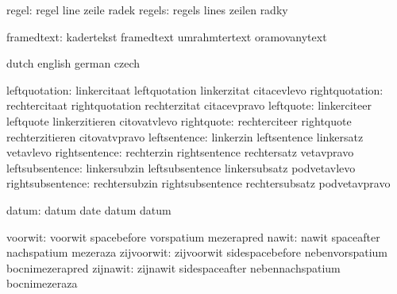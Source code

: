               regel:  regel                line                zeile
                      radek
             regels:  regels               lines               zeilen
                      radky

         framedtext:  kadertekst           framedtext          umrahmtertext
                      oramovanytext

\stopvariables




\startconstants        dutch                english              german
                       czech

       leftquotation:  linkercitaat         leftquotation        linkerzitat
                       citacevlevo
      rightquotation:  rechtercitaat        rightquotation       rechterzitat
                       citacevpravo
           leftquote:  linkerciteer         leftquote            linkerzitieren
                       citovatvlevo
          rightquote:  rechterciteer        rightquote           rechterzitieren
                       citovatvpravo
        leftsentence:  linkerzin            leftsentence         linkersatz
                       vetavlevo
       rightsentence:  rechterzin           rightsentence        rechtersatz
                       vetavpravo
     leftsubsentence:  linkersubzin         leftsubsentence      linkersubsatz
                       podvetavlevo
    rightsubsentence:  rechtersubzin        rightsubsentence     rechtersubsatz
                       podvetavpravo

               datum:  datum                date                 datum
                       datum

             voorwit:  voorwit              spacebefore          vorspatium
                       mezerapred
               nawit:  nawit                spaceafter           nachspatium
                       mezeraza
          zijvoorwit:  zijvoorwit           sidespacebefore      nebenvorspatium
                       bocnimezerapred
            zijnawit:  zijnawit             sidespaceafter       nebennachspatium
                       bocnimezeraza

